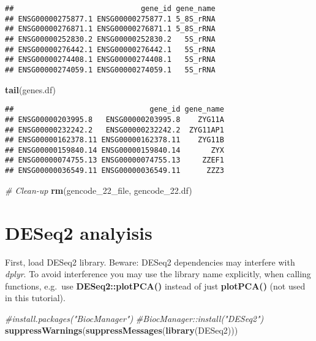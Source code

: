 \documentclass[]{book}
\newenvironment{Shaded}{\begin{snugshade}}{\end{snugshade}}
\newcommand{\KeywordTok}[1]{\textcolor[rgb]{0.13,0.29,0.53}{\textbf{#1}}}
\newcommand{\FloatTok}[1]{\textcolor[rgb]{0.00,0.00,0.81}{#1}}
\newcommand{\CommentTok}[1]{\textcolor[rgb]{0.56,0.35,0.01}{\textit{#1}}}
\newcommand{\NormalTok}[1]{#1}
\begin{document}
\begin{verbatim}
##                             gene_id gene_name
## ENSG00000275877.1 ENSG00000275877.1 5_8S_rRNA
## ENSG00000276871.1 ENSG00000276871.1 5_8S_rRNA
## ENSG00000252830.2 ENSG00000252830.2   5S_rRNA
## ENSG00000276442.1 ENSG00000276442.1   5S_rRNA
## ENSG00000274408.1 ENSG00000274408.1   5S_rRNA
## ENSG00000274059.1 ENSG00000274059.1   5S_rRNA
\end{verbatim}

\begin{Shaded}
\begin{Highlighting}[]
\KeywordTok{tail}\NormalTok{(genes.df)}
\end{Highlighting}
\end{Shaded}

\begin{verbatim}
##                               gene_id gene_name
## ENSG00000203995.8   ENSG00000203995.8    ZYG11A
## ENSG00000232242.2   ENSG00000232242.2  ZYG11AP1
## ENSG00000162378.11 ENSG00000162378.11    ZYG11B
## ENSG00000159840.14 ENSG00000159840.14       ZYX
## ENSG00000074755.13 ENSG00000074755.13     ZZEF1
## ENSG00000036549.11 ENSG00000036549.11      ZZZ3
\end{verbatim}

\begin{Shaded}
\begin{Highlighting}[]
\CommentTok{# Clean-up}
\KeywordTok{rm}\NormalTok{(gencode_22_file, gencode_}\FloatTok{22.}\NormalTok{df)}
\end{Highlighting}
\end{Shaded}

\chapter{DESeq2 analyisis}\label{deseq2-analyisis}

First, load DESeq2 library. Beware: DESeq2 dependencies may interfere
with \emph{dplyr}. To avoid interference you may use the library name
explicitly, when calling functions, e.g.~use \textbf{DESeq2::plotPCA()}
instead of just \textbf{plotPCA()} (not used in this tutorial).

\begin{Shaded}
\begin{Highlighting}[]
\CommentTok{#install.packages("BiocManager")}
\CommentTok{#BiocManager::install("DESeq2")}
\KeywordTok{suppressWarnings}\NormalTok{(}\KeywordTok{suppressMessages}\NormalTok{(}\KeywordTok{library}\NormalTok{(DESeq2)))}
\end{Highlighting}
\end{Shaded}
\end{document}
